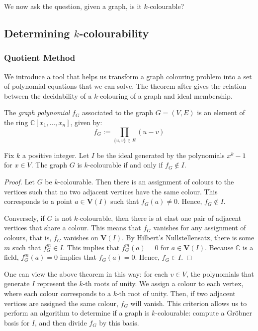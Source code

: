 \documentclass[../main.tex]{subfiles}
\begin{document}
    We now ask the question, given a graph, is it $k$-colourable?

    \subsection{Determining $k$-colourability}
    \subsubsection{Quotient Method}

    We introduce a tool that helps us transform a graph colouring problem into a set of polynomial equations that we can solve. The theorem after gives the relation between the decidability of a $k$-colouring of a graph and ideal membership.

    \begin{definition} \label{def:graph polynomial}
        The \emph{graph polynomial} $f_G$ associated to the graph $G=(V,E)$ is an element of the ring $\mathbb{C}[x_1,\dots,x_n]$, given by:
        $$f_G := \prod_{\{u,v\}\in E}(u-v)$$
    \end{definition}

    \begin{theorem}
        Fix $k$ a positive integer. Let $I$ be the ideal generated by the polynomials $x^k-1$ for $x\in V$. The graph $G$ is $k$-colourable if and only if $f_G\notin I$.
        \begin{proof}
            Let $G$ be $k$-colourable. Then there is an assignment of colours to the vertices such that no two adjacent vertices have the same colour. This corresponds to a point $a\in \mathbf{V}(I)$ such that $f_G(a)\neq 0$. Hence, $f_G\notin I$.

            Conversely, if $G$ is not $k$-colourable, then there is at elast one pair of adjacent vertices that share a colour. This means that $f_G$ vanishes for any assignment of colours, that is, $f_G$ vanishes on $\mathbf{V}(I)$. By Hilbert's Nullstellensatz, there is some $m$ such that $f_G^m\in I$. This implies that $f_G^m(a)=0$ for $a\in \mathbf{V}(I)$. Because $\mathbb{C}$ is a field, $f_G^m(a)=0$ implies that $f_G(a)=0$. Hence, $f_G\in I$.
        \end{proof}
    \end{theorem}

    One can view the above theorem in this way: for each $v\in V$, the polynomials that generate $I$ represent the $k$-th roots of unity. We assign a colour to each vertex, where each colour corresponds to a $k$-th root of unity. Then, if two adjacent vertices are assigned the same colour, $f_G$ will vanish. This criterion allows us to perform an algorithm to determine if a graph is $k$-colourable: compute a Gr\"obner basis for $I$, and then divide $f_G$ by this basis.
\end{document}
